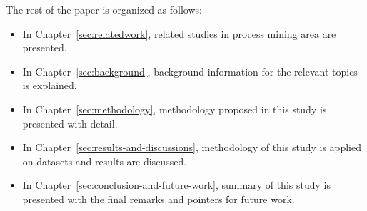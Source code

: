 The rest of the paper is organized as follows:
\begin{itemize}
	\item In Chapter~\ref{sec:relatedwork}, related studies in process mining area are presented. 
	\item In Chapter~\ref{sec:background}, background information for the relevant topics is explained.
	\item In Chapter~\ref{sec:methodology}, methodology proposed in this study is presented with detail.
	\item In Chapter~\ref{sec:results-and-discussions}, methodology of this study is applied on datasets and results are discussed.
	\item In Chapter~\ref{sec:conclusion-and-future-work}, summary of this study is presented with the final remarks and pointers for future work. 
\end{itemize}